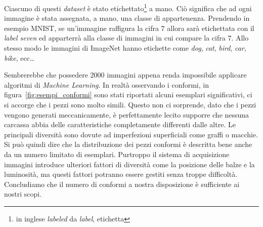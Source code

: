 Ciascuno di questi \textit{dataset} è stato etichettato\footnote{in inglese \textit{labeled} da \textit{label}, etichetta} a mano.
Ciò significa che ad ogni immagine è stata assegnata, a mano, una classe di appartenenza.
Prendendo in esempio MNIST, se un'immagine raffigura la cifra $7$ allora sarà etichettata con il \textit{label seven} ed apparterrà alla classe di immagini in cui compare la cifra $7$.
Allo stesso modo le immagini di ImageNet hanno etichette come \textit{dog}, \textit{cat}, \textit{bird}, \textit{car}, \textit{bike}, ecc\dots %

Sembrerebbe che possedere 2000 immagini appena renda impossibile applicare algoritmi di \textit{Machine Learning}.
In realtà osservando i conformi, in figura~\ref{fig:esempi_conformi} sono stati riportati alcuni esemplari significativi, ci si accorge che i pezzi sono molto simili.
Questo non ci sorprende, dato che i pezzi vengono generati meccanicamente, è perfettamente lecito supporre che nessuna carcassa abbia delle caratteristiche completamente differenti dalle altre.
Le principali diversità sono dovute ad imperfezioni superficiali come graffi o macchie.
Si può quindi dire che la distribuzione dei pezzi conformi è descritta bene anche da un numero limitato di esemplari.
Purtroppo il sistema di acquisizione immagini introduce ulteriori fattori di diversità come la posizione delle balze e la luminosità, ma questi fattori potranno essere gestiti senza troppe difficoltà.
Concludiamo che il numero di conformi a nostra disposizione è sufficiente ai nostri scopi.

